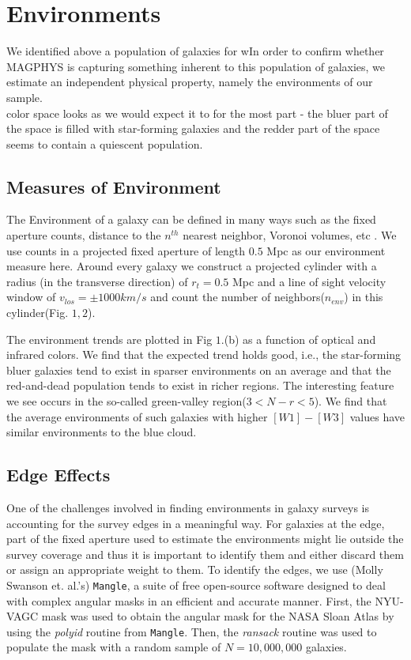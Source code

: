 \documentclass[iop]{emulateapj}
\begin{document}
\section{Environments}

We identified above a population of galaxies for wIn order to confirm whether MAGPHYS is capturing something inherent to this population of galaxies, we estimate an independent physical property, namely the environments of our sample.\\

color space looks as we would expect it to for the most part - the bluer part of the space is filled with star-forming galaxies and the redder part of the space seems to contain a quiescent population. 


\subsection{Measures of Environment}

The Environment of a galaxy can be defined in many ways such as the fixed aperture counts, distance to the $n^{th}$ nearest neighbor, Voronoi volumes, etc \cite[]{Coop06}. We use counts in a projected fixed aperture of length $0.5$ Mpc as our environment measure here. Around every galaxy we construct a projected cylinder with a radius (in the transverse direction) of $r_{t} = 0.5$ Mpc and a line of sight velocity window of $v_{los} = \pm 1000 km/s$ and count the number of neighbors($n_{env}$) in this cylinder(Fig. $1,2$).

The environment trends are plotted in Fig $1.$(b) as a function of optical and infrared colors. We find that the expected trend holds good, i.e., the star-forming bluer galaxies tend to exist in sparser environments on an average and that the red-and-dead population tends to exist in richer regions. The interesting feature we see occurs in the so-called green-valley region($3 <N-r < 5$). We find that the average environments of such galaxies with higher $[W1]-[W3]$ values have similar environments to the blue cloud.\\

\subsection{Edge Effects}

One of the challenges involved in finding environments in galaxy surveys is accounting for the survey edges in a meaningful way. For galaxies at the edge, part of the fixed aperture used to estimate the environments might lie outside the survey coverage and thus it is important to identify them and either discard them or assign an appropriate weight to them. To identify the edges, we use (Molly Swanson et. al.'s) \texttt{Mangle}, a suite of free open-source software designed to deal with complex angular masks in an efficient and accurate manner. First, the NYU-VAGC mask was used to obtain the angular mask for the NASA Sloan Atlas by using the \emph{polyid} routine from \texttt{Mangle}. Then, the \emph{ransack} routine was used to populate the mask with a random sample of $N = 10,000,000$ galaxies.
\end{document}
